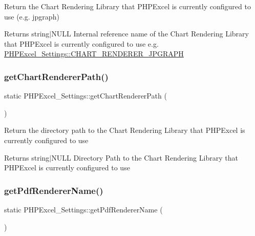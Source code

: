 Return the Chart Rendering Library that P\+H\+P\+Excel is currently configured to use (e.\+g. jpgraph)

\begin{DoxyReturn}{Returns}
string$\vert$\+N\+U\+LL Internal reference name of the Chart Rendering Library that P\+H\+P\+Excel is currently configured to use e.\+g. \hyperlink{classPHPExcel__Settings_ae4c1909d1fd2ef156cc33144a463e4a2}{P\+H\+P\+Excel\+\_\+\+Settings\+::\+C\+H\+A\+R\+T\+\_\+\+R\+E\+N\+D\+E\+R\+E\+R\+\_\+\+J\+P\+G\+R\+A\+PH} 
\end{DoxyReturn}
\mbox{\label{classPHPExcel__Settings_a40a645439b4ad20428d867afd34c2fc4}} 
\subsubsection{\texorpdfstring{get\+Chart\+Renderer\+Path()}{getChartRendererPath()}}
{\footnotesize\ttfamily static P\+H\+P\+Excel\+\_\+\+Settings\+::get\+Chart\+Renderer\+Path (\begin{DoxyParamCaption}{ }\end{DoxyParamCaption})\hspace{0.3cm}{\ttfamily [static]}}

Return the directory path to the Chart Rendering Library that P\+H\+P\+Excel is currently configured to use

\begin{DoxyReturn}{Returns}
string$\vert$\+N\+U\+LL Directory Path to the Chart Rendering Library that P\+H\+P\+Excel is currently configured to use 
\end{DoxyReturn}
\mbox{\label{classPHPExcel__Settings_a489ba783658916be65c853fea14f4202}} 
\subsubsection{\texorpdfstring{get\+Pdf\+Renderer\+Name()}{getPdfRendererName()}}
{\footnotesize\ttfamily static P\+H\+P\+Excel\+\_\+\+Settings\+::get\+Pdf\+Renderer\+Name (\begin{DoxyParamCaption}{ }\end{DoxyParamCaption})\hspace{0.3cm}{\ttfamily [static]}}

